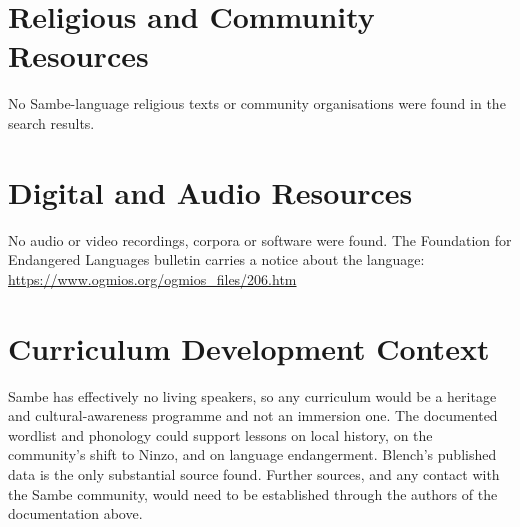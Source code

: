 \documentclass[12pt]{article}
\begin{document}
\section{Religious and Community Resources}
No Sambe-language religious texts or community organisations were found in the search results.

\section{Digital and Audio Resources}
No audio or video recordings, corpora or software were found. The Foundation for Endangered Languages bulletin carries a notice about the language: \url{https://www.ogmios.org/ogmios_files/206.htm}

\section{Curriculum Development Context}
Sambe has effectively no living speakers, so any curriculum would be a heritage and cultural-awareness programme and not an immersion one. The documented wordlist and phonology could support lessons on local history, on the community's shift to Ninzo, and on language endangerment. Blench's published data is the only substantial source found. Further sources, and any contact with the Sambe community, would need to be established through the authors of the documentation above.
\end{document}
